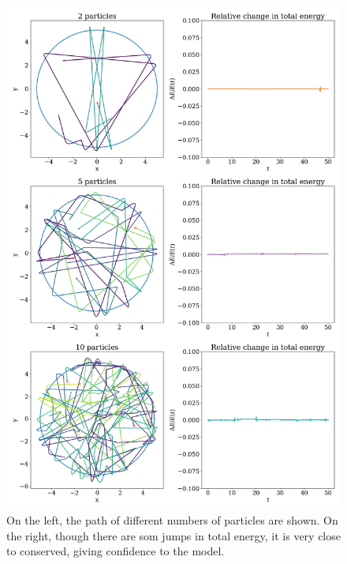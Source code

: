 \documentclass{article}
\begin{document}
        \begin{figure}
            
            \vspace{-16pt}
            \includegraphics[width = \textwidth]{several_particles}
            \caption{On the left, the path of different numbers of particles are shown. On the right, though there are som jumps in total energy, it is very close to conserved, giving confidence to the model.}
            \label{several particles}

        \end{figure}
\end{document}
